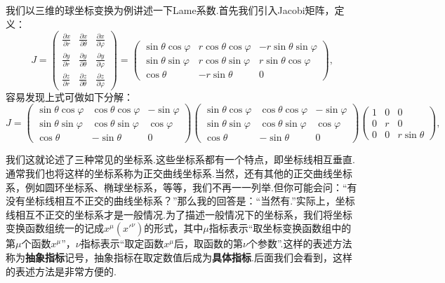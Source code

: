 		\begin{remark}
			我们以三维的球坐标变换为例讲述一下Lame系数.首先我们引入Jacobi矩阵，定义：
			\begin{equation}
				J=\begin{pmatrix}
					\frac{\partial x}{\partial r}&\frac{\partial x}{\partial \theta}&\frac{\partial x}{\partial \varphi}\\
					\frac{\partial y}{\partial r}&\frac{\partial y}{\partial \theta}&\frac{\partial y}{\partial \varphi}\\
					\frac{\partial z}{\partial r}&\frac{\partial z}{\partial \theta}&\frac{\partial z}{\partial \varphi}
				\end{pmatrix}
				=\begin{pmatrix}
					\sin\theta \cos\varphi&r\cos\theta\cos\varphi&-r\sin\theta\sin\varphi\\
					\sin\theta \sin\varphi&r\cos\theta\sin\varphi&r\sin\theta\cos\varphi\\
					\cos\theta&-r\sin\theta&0
				\end{pmatrix},
			\end{equation}
			容易发现上式可做如下分解：
			\begin{equation}
				J=\begin{pmatrix}
						\sin\theta\cos\varphi&\cos\theta\cos\varphi&-\sin\varphi\\
						\sin\theta\sin\varphi&\cos\theta\sin\varphi&\cos\varphi\\
						\cos\theta&-\sin\theta&0
					\end{pmatrix}
					\begin{pmatrix}
						\sin\theta\cos\varphi&\cos\theta\cos\varphi&-\sin\varphi\\
						\sin\theta\sin\varphi&\cos\theta\sin\varphi&\cos\varphi\\
						\cos\theta&-\sin\theta&0
					\end{pmatrix}
					\begin{pmatrix}
						1&0&0\\
						0&r&0\\
						0&0&r\sin\theta
					\end{pmatrix},
			\end{equation}

		\end{remark}
		我们这就论述了三种常见的坐标系.这些坐标系都有一个特点，即坐标线相互垂直.通常我们也将这样的坐标系称为正交曲线坐标系.当然，还有其他的正交曲线坐标系，例如圆环坐标系、椭球坐标系，等等，我们不再一一列举.但你可能会问：“有没有坐标线相互不正交的曲线坐标系？”那么我的回答是：“当然有.”实际上，坐标线相互不正交的坐标系才是一般情况.为了描述一般情况下的坐标系，我们将坐标变换函数组统一的记成$x^\mu(x'^\nu)$的形式，其中$\mu$指标表示“取坐标变换函数组中的第$\mu$个函数$x^\mu$”，$\nu$指标表示“取定函数$x^\mu$后，取函数的第$\nu$个参数”.这样的表述方法称为\textbf{抽象指标}记号，抽象指标在取定数值后成为\textbf{具体指标}.后面我们会看到，这样的表述方法是非常方便的.